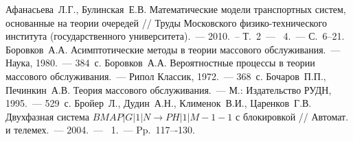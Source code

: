 \documentclass[a4paper,12pt,russian]{extarticle}
\newcommand{\No}{\textnumero}
\begin{document}
\newpage
\begin{thebibliography}{99}
 Афанасьева~Л.Г., Булинская~Е.В. Математические модели транспортных систем, основанные на теории очередей // Труды Московского физико-технического института (государственного университета).~--- 2010.~-- Т.~2~--- \No{}~4.~--- С.~6--21.
 Боровков~А.А. Асимптотические методы в теории массового обслуживания.~--- Наука, 1980.~--- 384~с.
 Боровков~А.А. Вероятностные процессы в теории массового обслуживания.~--- Рипол Классик, 1972.~--- 368~с.
 Бочаров~П.П., Печинкин~А.В. Теория массового обслуживания.~--- М.: Издательство РУДН, 1995.~--- 529~с.
 Бройер~Л., Дудин~А.Н., Клименок~В.И., Царенков~Г.В. Двухфазная система $BMAP|G|1|N \to PH|1|M-1-1$ с блокировкой // Автомат. и телемех.~--- 2004.~--- \No{}~1.~--- Pp.~117–-130.


\end{thebibliography}
\end{document}
